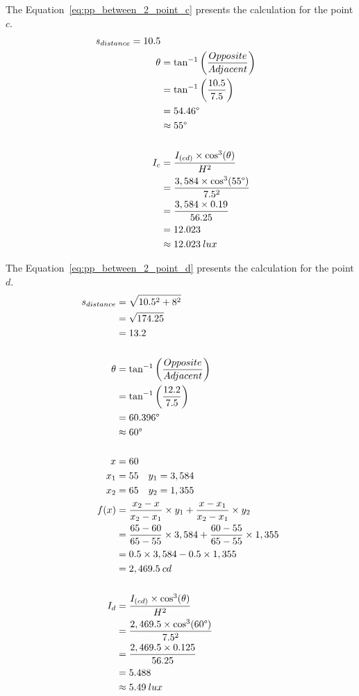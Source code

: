 The Equation~\ref{eq:pp_between_2_point_c} presents the calculation for the point $c$.
\begin{equation}
\begin{split}
s_{distance} = 10.5\\
\theta &= \tan^{-1}\left( \frac{Opposite}{Adjacent} \right) \\
 & = \tan^{-1}\left( \frac{10.5}{7.5} \right) \\
 & = 54.46\degree \\
 & \approx 55\degree\\
\\
I_c &= \frac{I_{(cd)} \times \cos^3(\theta)}{H^2} \\
 &= \frac{3,584 \times \cos^3(55\degree)}{7.5^2} \\
 &= \frac{3,584 \times 0.19}{56.25} \\
 & = 12.023 \\
 & \approx 12.023\: lux
\end{split}
\label{eq:pp_between_2_point_c}
\end{equation}

The Equation~\ref{eq:pp_between_2_point_d} presents the calculation for the point $d$.
\begin{equation}
\begin{split}
s_{distance} & = \sqrt{10.5^2 + 8^2} \\
 & = \sqrt{174.25} \\
 & = 13.2 \\
\\
\theta &= \tan^{-1}\left( \frac{Opposite}{Adjacent} \right) \\
 & = \tan^{-1}\left( \frac{12.2}{7.5} \right) \\
 & = 60.396\degree \\
 & \approx 60\degree\\
\\
x & = 60 \\
x_1 & = 55 \quad y_1 = 3,584 \\
x_2 & = 65 \quad y_2 = 1,355 \\
f(x) &= \frac{x_2 - x}{x_2 - x_1} \times y_1 +
       \frac{x - x_1}{x_2 - x_1} \times y_2 \\
 &= \frac{65 - 60}{65 - 55} \times 3,584 +
    \frac{60 - 55}{65 - 55} \times 1,355 \\
 & = 0.5 \times 3,584 - 0.5 \times 1,355 \\
 & = 2,469.5\: cd \\
\\
I_d &= \frac{I_{(cd)} \times \cos^3(\theta)}{H^2} \\
 &= \frac{2,469.5 \times \cos^3(60\degree)}{7.5^2} \\
 &= \frac{2,469.5 \times 0.125}{56.25} \\
 & = 5.488 \\
 & \approx 5.49\: lux
\end{split}
\label{eq:pp_between_2_point_d}
\end{equation}

